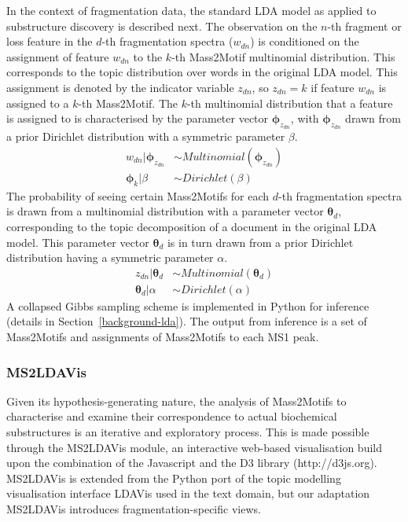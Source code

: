 In the context of fragmentation data, the standard LDA model as applied to substructure discovery is described next. The observation on the $n$-th fragment or loss feature in the $d$-th fragmentation spectra ($w_{dn}$) is conditioned on the assignment of feature $w_{dn}$ to the $k$-th Mass2Motif multinomial distribution. This corresponds to the topic distribution over words in the original LDA model. This assignment is denoted by the indicator variable $z_{dn}$, so $z_{dn}=k$ if feature $w_{dn}$ is assigned to a $k$-th Mass2Motif. The $k$-th multinomial distribution that a feature is assigned to is characterised by the parameter vector $\boldsymbol{\phi}_{z_{dn}}$, with $\boldsymbol{\phi}_{z_{dn}}$ drawn from a prior Dirichlet distribution with a symmetric parameter $\beta$. 
\begin{align}
w_{dn} \vert \boldsymbol{\phi}_{z_{dn}} &\sim Multinomial(\boldsymbol{\phi}_{z_{dn}}) \\
\boldsymbol{\phi}_{k} \vert \beta &\sim Dirichlet(\beta)
\end{align}
The probability of seeing certain Mass2Motifs for each $d$-th fragmentation spectra is drawn from a multinomial distribution with a parameter vector $\boldsymbol{\theta}_{d}$, corresponding to the topic decomposition of a document in the original LDA model. This parameter vector $\boldsymbol{\theta}_{d}$ is in turn drawn from a prior Dirichlet distribution having a symmetric parameter $\alpha$. 
\begin{align}
z_{dn} \vert \boldsymbol{\theta}_{d} &\sim Multinomial(\boldsymbol{\theta}_{d}) \\
\boldsymbol{\theta}_{d} \vert \alpha &\sim Dirichlet(\alpha)
\end{align}
A collapsed Gibbs sampling scheme is implemented in Python for inference (details in Section~\ref{background-lda}). The output from inference is a set of Mass2Motifs and assignments of Mass2Motifs to each MS1 peak. 

\subsubsection{MS2LDAVis}


Given its hypothesis-generating nature, the analysis of Mass2Motifs to characterise and examine their correspondence to actual biochemical substructures is an iterative and exploratory process. This is made possible through the MS2LDAVis module, an interactive web-based visualisation build upon the combination of the Javascript and the D3 library (http://d3js.org). MS2LDAVis is extended from the Python port of the topic modelling visualisation interface LDAVis \cite{Sievert2014} used in the text domain, but our adaptation MS2LDAVis introduces fragmentation-specific views.

